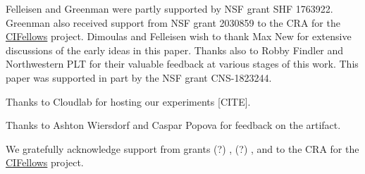 
\begin{acks}
Felleisen and Greenman were partly supported by NSF grant SHF
1763922.
Greenman also received support from NSF grant 2030859 to the CRA for the
\href{https://cifellows2020.org}{CIFellows} project.
Dimoulas and Felleisen wish to thank Max New for
extensive discussions of the early ideas in this paper. Thanks also to
Robby Findler and Northwestern PLT for their valuable feedback at
various stages of this work.
This paper was supported in part by the NSF grant CNS-1823244.


  Thanks to Cloudlab for hosting our experiments [CITE].

  Thanks to Ashton Wiersdorf and Caspar Popova for feedback on the artifact.

We gratefully acknowledge support from
 grants
  (?) \href{"https://www.nsf.gov/awardsearch/showAward?AWD_ID=1763922"}{},
  (?) \href{"https://www.nsf.gov/awardsearch/showAward?AWD_ID=1823244"}{},
 and
 \href{"https://www.nsf.gov/awardsearch/showAward?AWD_ID=2030859"}{}
  to the CRA for the \href{https://cifellows2020.org}{CIFellows} project.

\end{acks}
